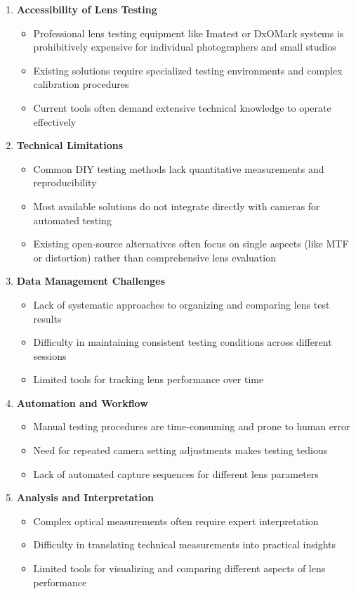 \begin{enumerate}
    \item \textbf{Accessibility of Lens Testing}
    \begin{itemize}
        \item Professional lens testing equipment like Imatest or DxOMark systems is prohibitively expensive for individual photographers and small studios
        \item Existing solutions require specialized testing environments and complex calibration procedures
        \item Current tools often demand extensive technical knowledge to operate effectively
    \end{itemize}

    \item \textbf{Technical Limitations}
    \begin{itemize}
        \item Common DIY testing methods lack quantitative measurements and reproducibility
        \item Most available solutions do not integrate directly with cameras for automated testing
        \item Existing open-source alternatives often focus on single aspects (like MTF or distortion) rather than comprehensive lens evaluation
    \end{itemize}

    \item \textbf{Data Management Challenges}
    \begin{itemize}
        \item Lack of systematic approaches to organizing and comparing lens test results
        \item Difficulty in maintaining consistent testing conditions across different sessions
        \item Limited tools for tracking lens performance over time
    \end{itemize}

    \item \textbf{Automation and Workflow}
    \begin{itemize}
        \item Manual testing procedures are time-consuming and prone to human error
        \item Need for repeated camera setting adjustments makes testing tedious
        \item Lack of automated capture sequences for different lens parameters
    \end{itemize}

    \item \textbf{Analysis and Interpretation}
    \begin{itemize}
        \item Complex optical measurements often require expert interpretation
        \item Difficulty in translating technical measurements into practical insights
        \item Limited tools for visualizing and comparing different aspects of lens performance
    \end{itemize}
\end{enumerate}

